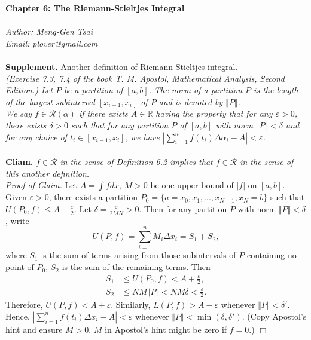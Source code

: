 \documentclass{article}
\begin{document}
\textbf{\Large Chapter 6: The Riemann-Stieltjes Integral} \\\\



\emph{Author: Meng-Gen Tsai} \\
\emph{Email: plover@gmail.com} \\\\






\textbf{Supplement.} Another definition of Riemann-Stieltjes integral. \\
\emph{(Exercise 7.3, 7.4 of the book
T. M. Apostol, Mathematical Analysis, Second Edition.)
Let $P$ be a partition of $[a, b]$.
The norm of a partition $P$ is the length of the largest subinterval $[x_{i-1}, x_i]$
of $P$ and is denoted by $\Vert P \Vert$.} \\

\emph{We say $f \in \mathscr{R}(\alpha)$
if there exists $A \in \mathbb{R}$ having the property that
for any $\varepsilon > 0$, there exists $\delta > 0$ such that
for any partition $P$ of $[a, b]$ with norm $\Vert P \Vert < \delta$
and for any choice of $t_i \in [x_{i-1}, x_i]$,
we have $|\sum_{i = 1}^{n} f(t_i) \Delta \alpha_i - A| < \varepsilon$.} \\\\

\textbf{Cliam.}
\emph{$f \in \mathscr{R}$ in the sense of Definition 6.2
implies that
$f \in \mathscr{R}$ in the sense of this another definition.} \\

\emph{Proof of Claim.}
Let $A = \int f dx$, $M > 0$ be one upper bound of $|f|$ on $[a, b]$.
Given $\varepsilon > 0$, there exists a partition
$P_0 = \{a = x_0, x_1, ..., x_{N-1}, x_N = b \}$
such that
$U(P_0, f) \leq A + \frac{\varepsilon}{2}$.
Let $\delta = \frac{\varepsilon}{2MN} > 0$.
Then for any partition $P$ with norm $\Vert P \Vert < \delta$, write
$$U(P, f) = \sum_{i = 1}^{n} M_i \Delta x_i = S_1 + S_2,$$
where
$S_1$ is the sum of terms arising from those subintervals of $P$ containing no point of $P_0$,
$S_2$ is the sum of the remaining terms.
Then
\begin{align*}
S_1 &\leq U(P_0, f) < A + \frac{\varepsilon}{2}, \\
S_2 &\leq NM \Vert P \Vert < NM \delta < \frac{\varepsilon}{2}.
\end{align*}
Therefore, $U(P, f) < A + \varepsilon$.
Similarly, $L(P, f) > A - \varepsilon$ whenever $\Vert P \Vert < \delta'$.
Hence, $|\sum_{i = 1}^{n} f(t_i) \Delta x_i - A| < \varepsilon$
whenever $\Vert P \Vert < \min(\delta, \delta')$.
(Copy Apostol's hint and ensure $M > 0$. $M$ in Apostol's hint might be zero if $f = 0$.)
$\Box$ \\
\end{document}
